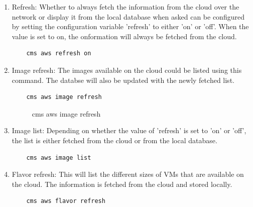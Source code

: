 \documentclass[9pt,twocolumn,twoside]{../../styles/osajnl}
\begin{document}
\begin{enumerate}
	
	\item Refresh: Whether to always fetch the information from the cloud over the network or display it from the local database when asked can be configured by setting the configuration variable 'refresh' to either 'on' or 'off'. When the value is set to on, the onformation will always be fetched from the cloud.
	
	\begin{verbatim}
    cms aws refresh on
	\end{verbatim}
	
	\item Image refresh: The images available on the cloud could be listed using this command. The databse will also be updated with the newly fetched list.
	
	\begin{verbatim}
    cms aws image refresh
	\end{verbatim}
	
	\begin{figure}[h!]
		\centering
		\caption{cms aws image refresh}
		\label{fig:imagerefresh}
	\end{figure}
		

	\item Image list: Depending on whether the value of 'refresh' is set to 'on' or 'off', the list is either fetched from the cloud or from the local database.
	
	\begin{verbatim}
    cms aws image list
	\end{verbatim}
	
	\item Flavor refresh: This will list the different sizes of VMs that are available on the cloud. The information is fetched from the cloud and stored locally.
	
	\begin{verbatim}
    cms aws flavor refresh
	\end{verbatim}
		

\end{enumerate}
\end{document}
